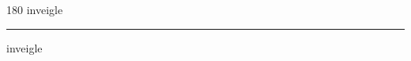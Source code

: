 
\begin{frame}
\begin{center}
\begin{turn}{180}
{\fontsize{2.5cm}{1em}\selectfont inveigle}
\end{turn}
\vspace{1em}\par  
\hrule
\vspace{1em}\par  
{\fontsize{2.5cm}{1em}\selectfont inveigle}
\end{center}
\end{frame}
